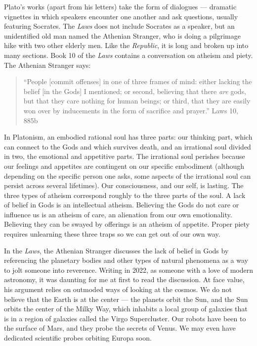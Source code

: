 \documentclass[
]{book}
\begin{document}
Plato's works (apart from his letters) take the form of dialogues --- dramatic vignettes in which speakers encounter one another and ask questions, usually featuring Socrates. The \emph{Laws} does not include Socrates as a speaker, but an unidentified old man named the Athenian Stranger, who is doing a pilgrimage hike with two other elderly men. Like the \emph{Republic}, it is long and broken up into many sections. Book 10 of the \emph{Laws} contains a conversation on atheism and piety. The Athenian Stranger says:

\begin{quote}
``People {[}commit offenses{]} in one of three frames of mind: either lacking the belief {[}in the Gods{]} I mentioned; or second, believing that there \emph{are} gods, but that they care nothing for human beings; or third, that they are easily won over by inducements in the form of sacrifice and prayer.'' Laws 10, 885b
\end{quote}

In Platonism, an embodied rational soul has three parts: our thinking part, which can connect to the Gods and which survives death, and an irrational soul divided in two, the emotional and appetitive parts. The irrational soul perishes because our feelings and appetites are contingent on our specific embodiment (although depending on the specific person one asks, some aspects of the irrational soul can persist across several lifetimes). Our consciousness, and our self, is lasting. The three types of atheism correspond roughly to the three parts of the soul. A lack of belief in Gods is an intellectual atheism. Believing the Gods do not care or influence us is an atheism of care, an alienation from our own emotionality. Believing they can be swayed by offerings is an atheism of appetite. Proper piety requires unlearning these three traps so we can get out of our own way.

In the \emph{Laws}, the Athenian Stranger discusses the lack of belief in Gods by referencing the planetary bodies and other types of natural phenomena as a way to jolt someone into reverence. Writing in 2022, as someone with a love of modern astronomy, it was daunting for me at first to read the discussion. At face value, his argument relies on outmoded ways of looking at the cosmos. We do not believe that the Earth is at the center --- the planets orbit the Sun, and the Sun orbits the center of the Milky Way, which inhabits a local group of galaxies that is in a region of galaxies called the Virgo Supercluster. Our robots have been to the surface of Mars, and they probe the secrets of Venus. We may even have dedicated scientific probes orbiting Europa soon.
\end{document}
